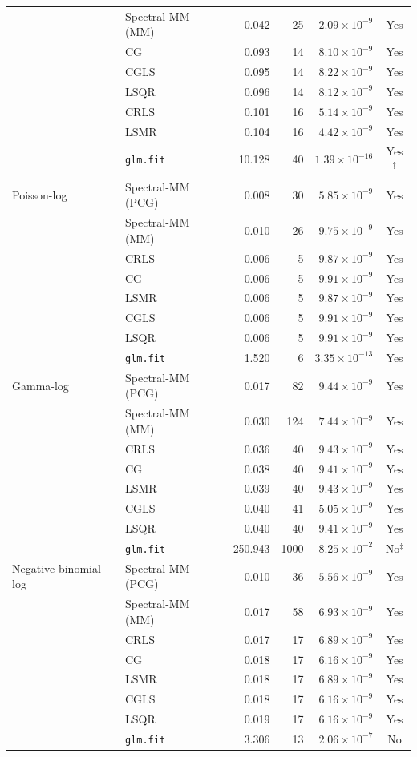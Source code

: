 \documentclass[10pt,a4paper]{article}
\begin{document}
\begin{longtable}{llrrrc}
 & Spectral-MM (MM) & 0.042 & 25 & $2.09\times10^{-9}$ & Yes \\
 & CG & 0.093 & 14 & $8.10\times10^{-9}$ & Yes \\
 & CGLS & 0.095 & 14 & $8.22\times10^{-9}$ & Yes \\
 & LSQR & 0.096 & 14 & $8.12\times10^{-9}$ & Yes \\
 & CRLS & 0.101 & 16 & $5.14\times10^{-9}$ & Yes \\
 & LSMR & 0.104 & 16 & $4.42\times10^{-9}$ & Yes \\
 & \texttt{glm.fit} & 10.128 & 40 & $1.39\times10^{-16}$ & Yes$^{\ddagger}$ \\
\midrule
Poisson-log & Spectral-MM (PCG) & 0.008 & 30 & $5.85\times10^{-9}$ & Yes \\
 & Spectral-MM (MM) & 0.010 & 26 & $9.75\times10^{-9}$ & Yes \\
 & CRLS & 0.006 & 5 & $9.87\times10^{-9}$ & Yes \\
 & CG & 0.006 & 5 & $9.91\times10^{-9}$ & Yes \\
 & LSMR & 0.006 & 5 & $9.87\times10^{-9}$ & Yes \\
 & CGLS & 0.006 & 5 & $9.91\times10^{-9}$ & Yes \\
 & LSQR & 0.006 & 5 & $9.91\times10^{-9}$ & Yes \\
 & \texttt{glm.fit} & 1.520 & 6 & $3.35\times10^{-13}$ & Yes \\
\midrule
Gamma-log & Spectral-MM (PCG) & 0.017 & 82 & $9.44\times10^{-9}$ & Yes \\
 & Spectral-MM (MM) & 0.030 & 124 & $7.44\times10^{-9}$ & Yes \\
 & CRLS & 0.036 & 40 & $9.43\times10^{-9}$ & Yes \\
 & CG & 0.038 & 40 & $9.41\times10^{-9}$ & Yes \\
 & LSMR & 0.039 & 40 & $9.43\times10^{-9}$ & Yes \\
 & CGLS & 0.040 & 41 & $5.05\times10^{-9}$ & Yes \\
 & LSQR & 0.040 & 40 & $9.41\times10^{-9}$ & Yes \\
 & \texttt{glm.fit} & 250.943 & 1000 & $8.25\times10^{-2}$ & No$^{\ddagger}$ \\
\midrule
Negative-binomial-log & Spectral-MM (PCG) & 0.010 & 36 & $5.56\times10^{-9}$ & Yes \\
 & Spectral-MM (MM) & 0.017 & 58 & $6.93\times10^{-9}$ & Yes \\
 & CRLS & 0.017 & 17 & $6.89\times10^{-9}$ & Yes \\
 & CG & 0.018 & 17 & $6.16\times10^{-9}$ & Yes \\
 & LSMR & 0.018 & 17 & $6.89\times10^{-9}$ & Yes \\
 & CGLS & 0.018 & 17 & $6.16\times10^{-9}$ & Yes \\
 & LSQR & 0.019 & 17 & $6.16\times10^{-9}$ & Yes \\
 & \texttt{glm.fit} & 3.306 & 13 & $2.06\times10^{-7}$ & No \\
\end{longtable}
\end{document}
